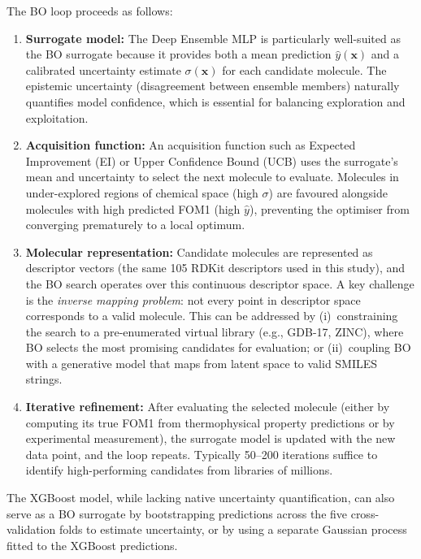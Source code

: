 \documentclass[11pt,a4paper]{article}
\begin{document}
The BO loop proceeds as follows:
\begin{enumerate}
    \item \textbf{Surrogate model:} The Deep Ensemble MLP is particularly well-suited as the BO surrogate because it provides both a mean prediction $\hat{y}(\mathbf{x})$ and a calibrated uncertainty estimate $\sigma(\mathbf{x})$ for each candidate molecule. The epistemic uncertainty (disagreement between ensemble members) naturally quantifies model confidence, which is essential for balancing exploration and exploitation.

    \item \textbf{Acquisition function:} An acquisition function such as Expected Improvement (EI) or Upper Confidence Bound (UCB) uses the surrogate's mean and uncertainty to select the next molecule to evaluate. Molecules in under-explored regions of chemical space (high $\sigma$) are favoured alongside molecules with high predicted FOM1 (high $\hat{y}$), preventing the optimiser from converging prematurely to a local optimum.

    \item \textbf{Molecular representation:} Candidate molecules are represented as descriptor vectors (the same 105 RDKit descriptors used in this study), and the BO search operates over this continuous descriptor space. A key challenge is the \emph{inverse mapping problem}: not every point in descriptor space corresponds to a valid molecule. This can be addressed by (i)~constraining the search to a pre-enumerated virtual library (e.g., GDB-17, ZINC), where BO selects the most promising candidates for evaluation; or (ii)~coupling BO with a generative model that maps from latent space to valid SMILES strings.

    \item \textbf{Iterative refinement:} After evaluating the selected molecule (either by computing its true FOM1 from thermophysical property predictions or by experimental measurement), the surrogate model is updated with the new data point, and the loop repeats. Typically 50--200 iterations suffice to identify high-performing candidates from libraries of millions.
\end{enumerate}

The XGBoost model, while lacking native uncertainty quantification, can also serve as a BO surrogate by bootstrapping predictions across the five cross-validation folds to estimate uncertainty, or by using a separate Gaussian process fitted to the XGBoost predictions.
\end{document}
